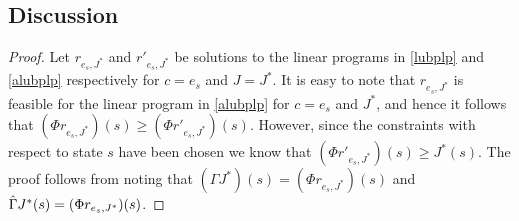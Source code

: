 \subsection{Discussion}
\begin{comment}
The error bounds in the main results (Theorems~\ref{cmt2mn} and \ref{polthe}) contain two factors, namely
\begin{enumerate}
\item $\min_{r\in \R^k} ||J^*-\Phi r||_{\mn}$, and
\item $||\Gamma J^*-\hg J^*||_{\mn}$.
\end{enumerate}
The first factor is related to the best possible approximation that can be achieved with the chosen feature matrix $\Phi$. This term is inherent to the ALP formulation and it appears in the bounds provided by \cite{ALP}.\par
The second factor is related to constraint approximation and is completely defined in terms of $\Phi$, $W$ and $T$, and does not require knowledge of stationary distribution of the optimal policy. It makes intuitive sense since given that $\Phi$ approximates $J^*$, it is enough for $W$ to depend on $\Phi$ and $T$ without any additional requirements.\par An interesting feature is that unlike prior work on constraint sampling based on concentration inequalities (e.g.,  \cite{CS}), our analysis is based on contraction operators and is completely deterministic.
In particular, the error term $\etmn$ gives new insights into constraint selection:
\begin{theorem}\label{st}
Let $s\in S$ be a state whose constraint is selected by $W$ (i.e., for some $i$ and all $(s',a)\in S\times A$, 
$W_{s'a,i}=\delta_{s=s'}$. 
Then
\begin{align}\label{sampexp}
|\Gamma J^*(s)-\hg J^*(s)|<|\Gamma J^*(s)-J^*(s)|.
\end{align}
\end{theorem}
\end{comment}
\begin{proof}
Let $r_{e_s,J^*}$ and ${r}'_{e_s,J^*}$ be solutions to the linear programs in \eqref{lubplp} and \eqref{alubplp} respectively for $c=e_s$ and $J=J^*$. It is easy to note that $r_{e_s,J^*}$ is feasible for the linear program in \eqref{alubplp} for $c=e_s$ and $J^*$, and hence it follows that $(\Phi r_{e_s,J^*})(s)\geq (\Phi {r}'_{e_s,J^*})(s)$. However, since the constraints with respect to state $s$ have been chosen we know that $(\Phi {r}'_{e_s,J^*})(s)\geq J^*(s)$. The proof follows from noting that $(\Gamma J^*)(s)=(\Phi r_{e_s,J^*})(s)$ and $\hat{\Gamma} J^*(s)=(\Phi {r}_{e_s,J^*})(s)$.
\end{proof}
